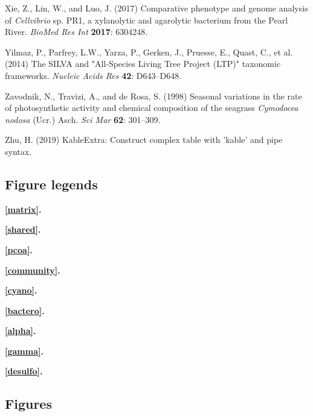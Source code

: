 \documentclass[12pt,]{article}
\begin{document}
\leavevmode\hypertarget{ref-Xie2017}{}%
Xie, Z., Lin, W., and Luo, J. (2017) Comparative phenotype and genome
analysis of \emph{Cellvibrio} sp. PR1, a xylanolytic and agarolytic
bacterium from the Pearl River. \emph{BioMed Res Int} \textbf{2017}:
6304248.

\leavevmode\hypertarget{ref-Yilmaz2014}{}%
Yilmaz, P., Parfrey, L.W., Yarza, P., Gerken, J., Pruesse, E., Quast,
C., et al. (2014) The SILVA and "All-Species Living Tree Project (LTP)"
taxonomic frameworks. \emph{Nucleic Acids Res} \textbf{42}: D643--D648.

\leavevmode\hypertarget{ref-Zavodnik1998}{}%
Zavodnik, N., Travizi, A., and de Rosa, S. (1998) Seasonal variations in
the rate of photosynthetic activity and chemical composition of the
seagrass \emph{Cymodocea nodosa} (Ucr.) Asch. \emph{Sci Mar}
\textbf{62}: 301--309.

\leavevmode\hypertarget{ref-Zhu2019}{}%
Zhu, H. (2019) KableExtra: Construct complex table with 'kable' and pipe
syntax.

\newpage 
\setlength\parindent{0pt}

\hypertarget{figure-legends}{%
\subsection{Figure legends}\label{figure-legends}}

\textbf{\autoref{matrix}.} 

\textbf{\autoref{shared}.} 

\textbf{\autoref{pcoa}.} 

\textbf{\autoref{community}.} 

\textbf{\autoref{cyano}.} 

\textbf{\autoref{bactero}.} 

\textbf{\autoref{alpha}.} 

\textbf{\autoref{gamma}.} 

\textbf{\autoref{desulfo}.} 

\hypertarget{figures}{%
\subsection{Figures}\label{figures}}
\end{document}

